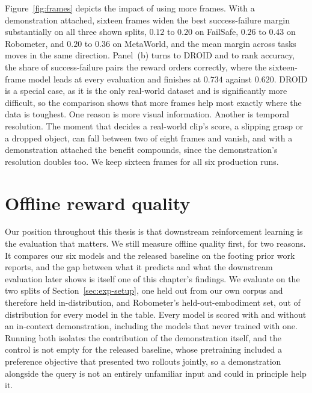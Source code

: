 Figure~\ref{fig:frames} depicts the impact of using more frames. With a demonstration attached, sixteen frames widen the best success-failure margin substantially on all three shown splits, $0.12$ to $0.20$ on FailSafe, $0.26$ to $0.43$ on Robometer, and $0.20$ to $0.36$ on MetaWorld, and the mean margin across tasks moves in the same direction. Panel~(b) turns to DROID and to rank accuracy, the share of success-failure pairs the reward orders correctly, where the sixteen-frame model leads at every evaluation and finishes at $0.734$ against $0.620$. DROID is a special case, as it is the only real-world dataset and is significantly more difficult, so the comparison shows that more frames help most exactly where the data is toughest. One reason is more visual information. Another is temporal resolution. The moment that decides a real-world clip's score, a slipping grasp or a dropped object, can fall between two of eight frames and vanish, and with a demonstration attached the benefit compounds, since the demonstration's resolution doubles too. We keep sixteen frames for all six production runs.

\section{Offline reward quality}
\label{sec:results-offline}

Our position throughout this thesis is that downstream reinforcement learning is the evaluation that matters. We still measure offline quality first, for two reasons. It compares our six models and the released baseline on the footing prior work reports, and the gap between what it predicts and what the downstream evaluation later shows is itself one of this chapter's findings. We evaluate on the two splits of Section~\ref{sec:exp-setup}, one held out from our own corpus and therefore held in-distribution, and Robometer's held-out-embodiment set, out of distribution for every model in the table. Every model is scored with and without an in-context demonstration, including the models that never trained with one. Running both isolates the contribution of the demonstration itself, and the control is not empty for the released baseline, whose pretraining included a preference objective that presented two rollouts jointly, so a demonstration alongside the query is not an entirely unfamiliar input and could in principle help it.

